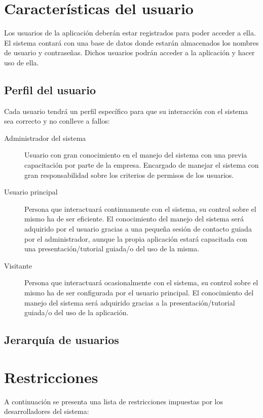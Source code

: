 \section{Caracter\'isticas del usuario}
Los usuarios de la aplicaci\'on deber\'an estar registrados para poder acceder a ella. El sistema contar\'a con una base de datos donde estar\'an almacenados los nombres de usuario y contrase\~nas. Dichos usuarios podr\'an acceder a la aplicaci\'on y hacer uso de ella.

\subsection{Perfil del usuario}
Cada usuario tendr\'a un perfil espec\'ifico para que su interacci\'on con el sistema sea correcto y no conlleve a fallos:
\begin{description}
\item[Administrador del sistema] Usuario con gran conocimiento en el manejo del sistema con una previa capacitaci\'on por parte de la empresa. Encargado de manejar el sistema con gran responsabilidad sobre los criterios de permisos de los usuarios.

\item[Usuario principal] Persona que interactuar\'a continuamente con el sistema, su control sobre el mismo ha de ser eficiente. El conocimiento del manejo del sistema ser\'a adquirido por el usuario gracias a una peque\~na sesi\'on de contacto guiada por el administrador, aunque la propia aplicaci\'on estar\'a capacitada con una presentaci\'on/tutorial guiada/o del uso de la misma.

\item[Visitante] Persona que interactuar\'a ocasionalmente con el sistema, su control sobre el mismo ha de ser configurada por el usuario principal. El conocimiento del manejo del sistema será adquirido gracias a la presentaci\'on/tutorial guiada/o del uso de la aplicaci\'on.
\end{description}

\subsection{Jerarqu\'ia de usuarios}

\section{Restricciones}
A continuaci\'on se presenta una lista de restricciones impuestas por los desarrolladores del sistema:


